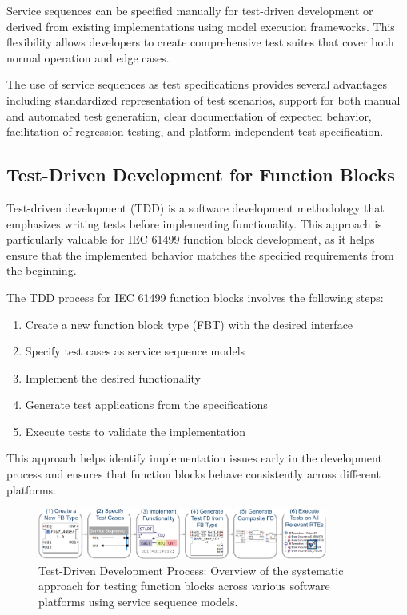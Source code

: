 Service sequences can be specified manually for test-driven development or derived from existing implementations using model execution frameworks. This flexibility allows developers to create comprehensive test suites that cover both normal operation and edge cases.

The use of service sequences as test specifications provides several advantages including standardized representation of test scenarios, support for both manual and automated test generation, clear documentation of expected behavior, facilitation of regression testing, and platform-independent test specification.

\subsection{Test-Driven Development for Function Blocks}

Test-driven development (TDD) is a software development methodology that emphasizes writing tests before implementing functionality. This approach is particularly valuable for IEC 61499 function block development, as it helps ensure that the implemented behavior matches the specified requirements from the beginning.

The TDD process for IEC 61499 function blocks involves the following steps:

\begin{enumerate}
    \item Create a new function block type (FBT) with the desired interface
    \item Specify test cases as service sequence models
    \item Implement the desired functionality
    \item Generate test applications from the specifications
    \item Execute tests to validate the implementation
\end{enumerate}

This approach helps identify implementation issues early in the development process and ensures that function blocks behave consistently across different platforms.

\begin{figure}[!htbp]
    \centering
    \includegraphics[width=0.85\textwidth]{MX_Papers/Paper9/Figures/process-crop.pdf}
    \caption{Test-Driven Development Process: Overview of the systematic approach for testing function blocks across various software platforms using service sequence models.}
    \label{fig:tdd_process}
\end{figure}

